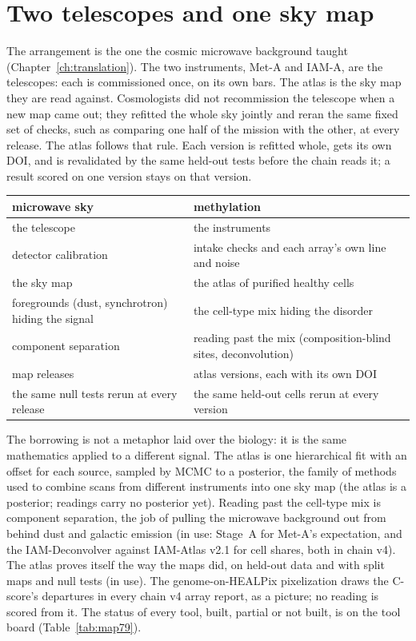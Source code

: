 \section{Two telescopes and one sky map}\label{sec:atlas:skymap}

The arrangement is the one the cosmic microwave background taught (Chapter~\ref{ch:translation}). The two instruments, Met-A and IAM-A, are
the telescopes: each is commissioned once, on its own bars. The atlas is the sky map they are read against. Cosmologists did not
recommission the telescope when a new map came out; they refitted the whole sky jointly and reran the same fixed set of checks, such as
comparing one half of the mission with the other, at every release. The atlas follows that rule. Each version is refitted whole, gets its
own DOI, and is revalidated by the same held-out tests before the chain reads it; a result scored on one version stays on that version.

\begin{center}\small
\begin{tabular}{p{}p{}}
\hline
\textbf{microwave sky} & \textbf{methylation} \\ \hline
the telescope & the instruments \\
detector calibration & intake checks and each array's own line and noise \\
the sky map & the atlas of purified healthy cells \\
foregrounds (dust, synchrotron) hiding the signal & the cell-type mix hiding the disorder \\
component separation & reading past the mix (composition-blind sites, deconvolution) \\
map releases & atlas versions, each with its own DOI \\
the same null tests rerun at every release & the same held-out cells rerun at every version \\ \hline
\end{tabular}
\end{center}

The borrowing is not a metaphor laid over the biology: it is the same mathematics applied to a different signal. The atlas is one
hierarchical fit with an offset for each source, sampled by MCMC to a posterior, the family of methods used to combine scans from different
instruments into one sky map (the atlas is a posterior; readings carry no posterior yet). Reading past the cell-type mix is component separation,
the job of pulling the microwave background out from behind dust and galactic emission (in use: Stage~A for Met-A's expectation, and the IAM-Deconvolver against IAM-Atlas v2.1 for cell shares, both in chain v4). The atlas proves itself the way the maps did, on held-out data and with split maps and null tests (in use). The genome-on-HEALPix pixelization draws the C-score's departures in every chain v4 array report, as a picture; no reading is scored from it. The status of every tool, built, partial or not built, is on the tool board
(Table~\ref{tab:map79}).

